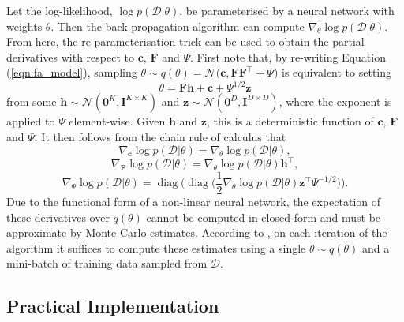 \documentclass[msc,deptreport.inf]{infthesis} %
\newcommand{\matr}[1]{\mathbf{#1}}
\newcommand{\diag}{\mathop{\mathrm{diag}}}
\begin{document}
Let the log-likelihood, $\log p(\mathcal{D} | \theta)$, be parameterised by a neural network with weights $\theta$. Then the back-propagation algorithm \cite{rumelhart1986} can compute $\nabla_\theta \log p(\mathcal{D} | \theta)$. From here, the re-parameterisation trick \cite{goodfellow2016} can be used to obtain the partial derivatives with respect to $\matr{c}$, $\matr{F}$ and $\Psi$. First note that, by re-writing Equation (\ref{eqn:fa_model}), sampling $\theta \sim q(\theta) = \mathcal{N}\big(\matr{c}, \matr{FF}^{\intercal} + \Psi\big)$ is equivalent to setting  
\begin{equation}\label{eqn:fa_reparam_trick}
	\theta = \matr{Fh} + \matr{c} + \Psi^{1/2} \matr{z}
\end{equation}
from some $\matr{h} \sim \mathcal{N}(\matr{0}^K, \matr{I}^{K \times K})$ and $\matr{z} \sim \mathcal{N}(\matr{0}^D, \matr{I}^{D \times D})$, where the exponent is applied to $\Psi$ element-wise. Given $\matr{h}$ and $\matr{z}$, this is a deterministic function of $\matr{c}$, $\matr{F}$ and $\Psi$. It then follows from the chain rule of calculus that
\begin{equation}
	\nabla_{\matr{c}} \log p(\mathcal{D} | \theta) = \nabla_\theta \log p(\mathcal{D} | \theta),
\end{equation}
\begin{equation}
	\nabla_{\matr{F}} \log p(\mathcal{D} | \theta) = \nabla_\theta \log p(\mathcal{D} | \theta) \matr{h}^\intercal,
\end{equation}
\begin{equation}\label{eqn:grad_likelihood_wrt_psi}
	\nabla_{\Psi} \log p(\mathcal{D} | \theta) =  \diag\Big(\diag\Big(\frac{1}{2} \nabla_\theta \log p(\mathcal{D} | \theta) \matr{z}^\intercal \Psi^{-1/2}\Big)\Big).
\end{equation}
Due to the functional form of a non-linear neural network, the expectation of these derivatives over $q(\theta)$ cannot be computed in closed-form and must be approximate by Monte Carlo estimates. According to \cite{kingma2013}, on each iteration of the algorithm it suffices to compute these estimates using a single $\theta \sim q(\theta)$ and a mini-batch of training data sampled from $\mathcal{D}$. 

\subsection{Practical Implementation}
\end{document}
